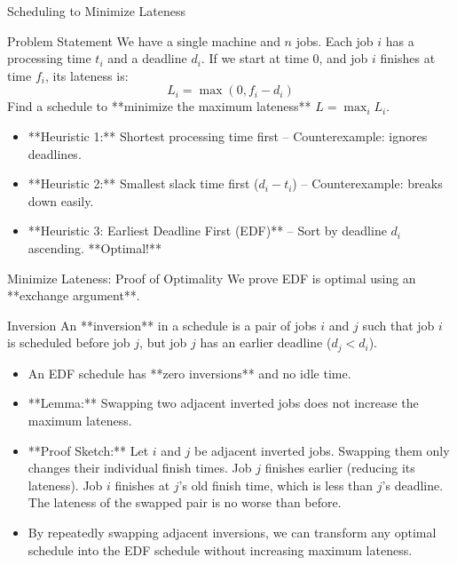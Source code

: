 \documentclass[aspectratio=169,xcolor=dvipsnames]{beamer}
\begin{document}
\begin{frame}{Scheduling to Minimize Lateness}
  \begin{block}{Problem Statement}
    We have a single machine and $n$ jobs. Each job $i$ has a processing time $t_i$ and a deadline $d_i$.
    If we start at time 0, and job $i$ finishes at time $f_i$, its lateness is:
    $$L_i = \max(0, f_i - d_i)$$
    Find a schedule to **minimize the maximum lateness** $L = \max_i L_i$.
  \end{block}
  \begin{itemize}
    \item **Heuristic 1:** Shortest processing time first -- Counterexample: ignores deadlines.
    \item **Heuristic 2:** Smallest slack time first ($d_i - t_i$) -- Counterexample: breaks down easily.
    \item **Heuristic 3: Earliest Deadline First (EDF)** -- Sort by deadline $d_i$ ascending. **Optimal!**
  \end{itemize}
\end{frame}

\begin{frame}{Minimize Lateness: Proof of Optimality}
  We prove EDF is optimal using an **exchange argument**.
  \begin{definition}{Inversion}
    An **inversion** in a schedule is a pair of jobs $i$ and $j$ such that job $i$ is scheduled before job $j$, but job $j$ has an earlier deadline ($d_j < d_i$).
  \end{definition}
  \begin{itemize}
    \item An EDF schedule has **zero inversions** and no idle time.
    \item **Lemma:** Swapping two adjacent inverted jobs does not increase the maximum lateness.
    \item **Proof Sketch:** Let $i$ and $j$ be adjacent inverted jobs. Swapping them only changes their individual finish times. Job $j$ finishes earlier (reducing its lateness). Job $i$ finishes at $j$'s old finish time, which is less than $j$'s deadline. The lateness of the swapped pair is no worse than before.
    \item By repeatedly swapping adjacent inversions, we can transform any optimal schedule into the EDF schedule without increasing maximum lateness.
  \end{itemize}
\end{frame}

\end{document}
